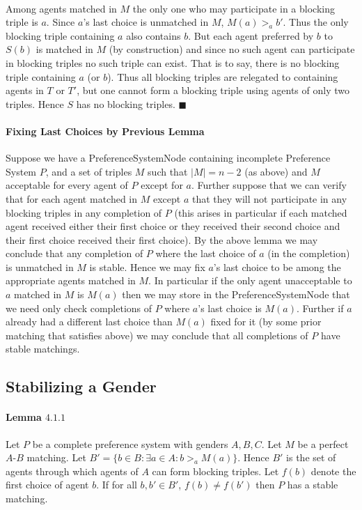 \documentclass[letterpaper,12pt,oneside,onecolumn]{article}
\begin{document}
\paragraph{}
Among agents matched in $M$ the only one who may participate in a blocking triple is $a$. Since $a$'s last choice is unmatched in $M$, $M(a) >_a b'$. Thus the only blocking triple containing $a$ also contains $b$. But each agent preferred by $b$ to $S(b)$ is matched in $M$ (by construction) and since no such agent can participate in blocking triples no such triple can exist. That is to say, there is no blocking triple containing $a$ (or $b$). Thus all blocking triples are relegated to containing agents in $T$ or $T'$, but one cannot form a blocking triple using agents of only two triples. Hence $S$ has no blocking triples. $\blacksquare$
\paragraph{Fixing Last Choices by Previous Lemma}
Suppose we have a PreferenceSystemNode containing incomplete Preference System $P$, and a set of triples $M$ such that $|M| = n-2$ (as above) and $M$ acceptable for every agent of $P$ except for $a$. Further suppose that we can verify that for each agent matched in $M$ except $a$ that they will not participate in any blocking triples in any completion of $P$ (this arises in particular if each matched agent received either their first choice or they received their second choice and their first choice received their first choice). By the above lemma we may conclude that any completion of $P$ where the last choice of $a$ (in the completion) is unmatched in $M$ is stable. Hence we may fix $a$'s last choice to be among the appropriate agents matched in $M$. In particular if the only agent unacceptable to $a$ matched in $M$ is $M(a)$ then we may store in the PreferenceSystemNode that we need only check completions of $P$ where $a$'s last choice is $M(a)$. Further if $a$ already had a different last choice than $M(a)$ fixed for it (by some prior matching that satisfies above) we may conclude that all completions of $P$ have stable matchings.
\subsection{Stabilizing a Gender}
\paragraph{Lemma $4.1.1$}
Let $P$ be a complete preference system with genders $A,B,C$. Let $M$ be a perfect $A$-$B$ matching. Let $B' = \{ b \in B : \exists a \in A : b >_a M(a) \}$. Hence $B'$ is the set of agents through which agents of $A$ can form blocking triples. Let $f(b)$ denote the first choice of agent $b$. If for all $b, b' \in B'$, $f(b) \neq f(b')$ then $P$ has a stable matching.
\end{document}
